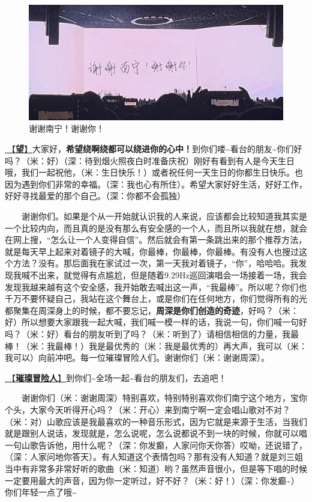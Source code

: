 \documentclass[]{ctexbook}
\begin{document}
\begin{figure}

{\centering \includegraphics[width=400pt]{img/nanning20241206/thank-nanning} 

}

\caption{谢谢南宁！谢谢你！}\label{fig:unnamed-chunk-156}
\end{figure}

\hyperref[Gaze]{🎵【\textbf{望}】}大家好，\textbf{希望绕啊绕都可以绕进你的心中！}到你们喽\textasciitilde 看台的朋友\textasciitilde 你们好吗？（米：好）（深：待到烟火照夜白时准备庆祝）刚好有看到有人是今天生日哦，我们一起祝他，（米：生日快乐！）或者祝任何一天生日的你都生日快乐。也因为遇到你们非常的幸福。（深：我也心有所住）。希望大家好好生活，好好工作，好好寻找最爱的那个自己。（深：你都不会孤独）

  谢谢你们。如果是个从一开始就认识我的人来说，应该都会比较知道我其实是一个比较内向，而且真的是没有那么有安全感的一个人，而且所以我就在想，就会在网上搜，``怎么让一个人变得自信''。然后就会有第一条跳出来的那个推荐方法，就是每天早上起来对着镜子的大喊，你最棒，你最棒，你最棒。有没有人也搜过这个方法？没有。那后面我在家试过一次，第一天我对着镜子，``你''，哈哈哈。我发现我喊不出来，就觉得有点尴尬，但是随着9.29Hz巡回演唱会一场接着一场，我会发现我越来越有这个安全感，我开始敢去喊出这一声，``我最棒''。所以呢？你们也千万不要怀疑自己，我站在这个舞台上，或是你们在任何地方，你们觉得所有的光都聚集在周深身上的时候，都不要忘记，\textbf{周深是你们创造的奇迹}，好吗？（米：好）所以想要大家跟我一起大喊，我们喊一模一样的话，我说一句，你们喊一句好吗？（米：好）看台的朋友听到了吗？（米：听到了）请相信相信的力量，我最棒！（米：我最棒！）我是最优秀的（米：我是最优秀的）再大声，我可以（米：我可以）向前冲吧。每一位璀璨冒险人们。谢谢你们（米：谢谢周深）。

\hyperref[adventurers]{🎵【\textbf{璀璨冒险人}】}到你们\textasciitilde 全场一起\textasciitilde 看台的朋友们，去追吧！

  谢谢你们（米：谢谢周深）特别喜欢，特别特别喜欢你们南宁这个地方，宝你个头，大家今天听得开心吗？（米：开心）来到南宁啊一定会唱山歌对不对？（米：对）山歌应该是我最喜欢的一种音乐形式，因为它就是来源于生活，当我们就是跟别人说话，发现就是，怎么说呢，怎么说都说不到一块的时候，你就可以唱一句山歌告诉他，用什么呢？（深：你发癫，人家问你天你答）哎呦，还说错了，（深：人家问地你答天）。有人知道这个表情包吗？那有没有人知道？就是刘三姐当中有非常多非常好听的歌曲（米：知道）哟？虽然声音很小，但是等下唱的时候一定要用最大的声音，因为你一定听过，好不好？（米：好！）（深：你发癫\textasciitilde）你们年轻一点了哦\textasciitilde{}
\end{document}
